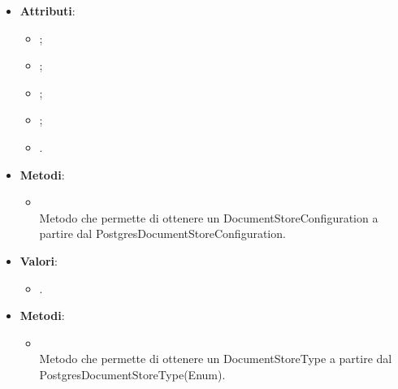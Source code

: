 \documentclass[10pt, a4paper]{article}
\begin{document}
\label{PostgresDocumentStoreConfigurationDettaglio}
\begin{itemize}
    \item \textbf{Attributi}:
    \begin{itemize}
        \item {};
        \item {};
        \item {};
        \item {};
        \item {}.  
    \end{itemize}
    \item \textbf{Metodi}:
    \begin{itemize}
        \item {}\\ 
        Metodo che permette di ottenere un DocumentStoreConfiguration a partire dal PostgresDocumentStoreConfiguration.
    \end{itemize}
\end{itemize}

\label{PostgresDocumentStoreTypeDettaglio}
\begin{itemize}
    \item \textbf{Valori}:
    \begin{itemize}
        \item {}. 
    \end{itemize}
    \item \textbf{Metodi}:
    \begin{itemize}
        \item {}\\ 
        Metodo che permette di ottenere un DocumentStoreType a partire dal PostgresDocumentStoreType(Enum).
    \end{itemize}
\end{itemize}
\end{document}
